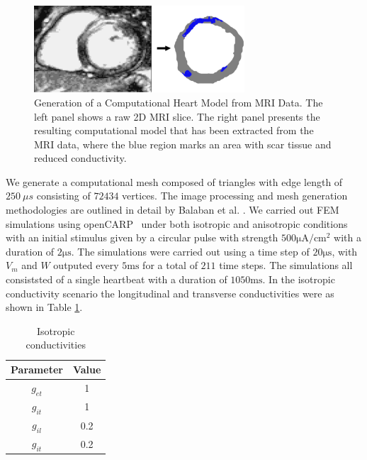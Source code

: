 \begin{figure}[h]
  \centering
  \includegraphics[width=0.7\textwidth]{Figs/Anisotropic/MRI_to_model.pdf}
  \caption{Generation of a Computational Heart Model from MRI Data. The left panel shows a raw 2D MRI slice. The right panel presents the resulting computational model that has been extracted from the MRI data, where the blue region marks an area with scar tissue and reduced conductivity.}
  \label{fig:mri}
\end{figure}
We generate a computational mesh composed of triangles with edge length of $250\mathrm~{\mu s}$ consisting of $72434$ vertices. The image processing and mesh generation methodologies are outlined in detail by Balaban et al. \cite{balaban}.
We carried out FEM simulations using openCARP~\cite{openCARP-sw} under both isotropic and anisotropic conditions with an initial stimulus given by a circular pulse with strength $500 \mathrm{\mu A/cm^2}$ with a duration of $2\mathrm{\mu s}$. The simulations were carried out using a time step of $20\mathrm{\mu s}$, with $V_m$ and $W$ outputed every $5\mathrm{ms}$ for a total of $211$ time steps. The simulations all consiststed of a single heartbeat with a duration of $1050\mathrm{ms}$. 
In the isotropic conductivity scenario the longitudinal and transverse conductivities were as shown in Table \ref{tab:Isotropic_g}. 
\begin{table}[h]
  \centering
  \begin{tabular}{|c|c|}
    \hline
    Parameter & Value \\ \hline
    $g_{et}$ & 1 \\ \hline
    $g_{it}$ & 1 \\ \hline
    $g_{il}$ & 0.2 \\ \hline
    $g_{it}$ & 0.2 \\ \hline
  \end{tabular}
  \caption{Isotropic conductivities}
  \label{tab:Isotropic_g}
\end{table}

